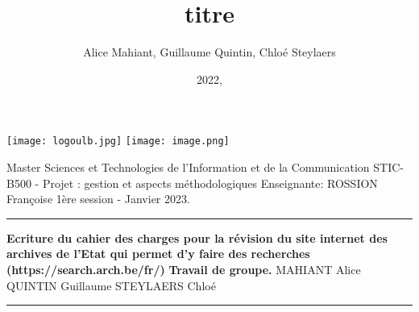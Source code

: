 \documentclass[a4paper,12pt]{article}
\title{titre}
\author{Alice Mahiant, Guillaume Quintin, Chloé Steylaers}
\date{2022,}
\begin{document}
\begin{center}
 \texttt{[image: logoulb.jpg]}
 \texttt{[image: image.png]}
 \end{center}
 \vspace*{1cm}
 Master Sciences et Technologies de l'Information et de la Communication
 \newline STIC-B500 - Projet : gestion et aspects méthodologiques
   \vspace*{0,5cm}
    \newline Enseignante: ROSSION Françoise
 \newline 1ère session  - Janvier 2023.
  \vspace*{0,5cm}
 \newline \rule{11cm}{0,02cm}
 \vspace*{1,5cm}
 \newline \textbf{{\Large Ecriture du cahier des charges pour la révision du site internet des archives de l'Etat qui permet d'y faire des recherches (https://search.arch.be/fr/)}}
   \vspace*{0,5cm}
 \newline\textbf{{\large Travail de groupe.}}
 \vspace*{1cm}
 \newline MAHIANT Alice
 \newline QUINTIN Guillaume
 \newline STEYLAERS Chloé
 \vspace*{0,5cm}
 \newline \rule{4cm}{0,02cm}
  
\begin{footnotesize}
\newpage
\tableofcontents
\newpage
\end{footnotesize}
\end{document}
